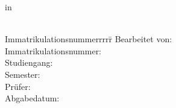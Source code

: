 \begin{centering}
		\Large \textbf{\Institution}\\
		\Large \Programme \\
		\vfill
		\LARGE \textbf{\Title} \\
		\Subtitle \\
		\vfill
		\LARGE \AsssignmentName \\ %
		\Large in \\
		\LARGE  \Class \\
		\vfill
		\begin{small}
			\begin{doublespace}
				\begin{tabbing}
					Immatrikulationsnummerrrrr\=\kill
					Bearbeitet von:\>\Name\\
					Immatrikulationsnummer:\>\MatrikelNummer\\
					Studiengang:\>\Programme\\
					Semester:\>\Semester\\
					Prüfer:\>\Supervisor\\
					Abgabedatum:\>\Date
				\end{tabbing}
			\end{doublespace}
		\end{small}
		
	\end{centering}\vspace{1cm}
